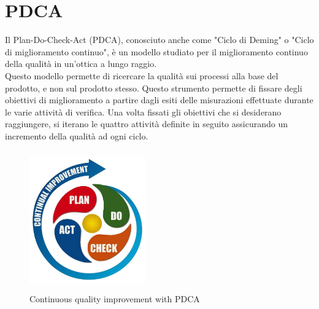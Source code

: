 \documentclass[PdQ.tex]{subfiles}
\begin{document}
\section{PDCA}

Il Plan-Do-Check-Act (PDCA), conosciuto anche come "Ciclo di Deming" o "Ciclo di miglioramento continuo", è un modello studiato per il miglioramento continuo della qualità in un’ottica a lungo raggio.\\ 
Questo modello permette di ricercare la qualità sui processi alla base del prodotto, e non sul prodotto stesso.
Questo strumento permette di fissare degli obiettivi di miglioramento a partire dagli esiti delle misurazioni effettuate durante le varie attività di verifica.
Una volta fissati gli obiettivi che si desiderano raggiungere, si iterano le quattro attività definite in seguito assicurando un incremento della qualità ad ogni ciclo.
\begin{figure}[htbp]
	\centering
	\includegraphics[height=6cm, width=5cm]{pdca.jpg}
	\caption{Continuous quality improvement with PDCA}\label{fig:pdca}
\end{figure}
\end{document}
